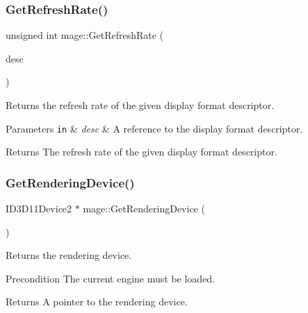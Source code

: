 \subsubsection{\texorpdfstring{Get\+Refresh\+Rate()}{GetRefreshRate()}}
{\footnotesize\ttfamily unsigned int mage\+::\+Get\+Refresh\+Rate (\begin{DoxyParamCaption}\item[{const D\+X\+G\+I\+\_\+\+M\+O\+D\+E\+\_\+\+D\+E\+S\+C1 \&}]{desc }\end{DoxyParamCaption})\hspace{0.3cm}{\ttfamily [noexcept]}}

Returns the refresh rate of the given display format descriptor.


\begin{DoxyParams}[1]{Parameters}
\mbox{\tt in}  & {\em desc} & A reference to the display format descriptor. \\
\hline
\end{DoxyParams}
\begin{DoxyReturn}{Returns}
The refresh rate of the given display format descriptor. 
\end{DoxyReturn}
\hypertarget{namespacemage_aa20b591269a1196de06bb1b8a6be5262}{}\label{namespacemage_aa20b591269a1196de06bb1b8a6be5262} 
\subsubsection{\texorpdfstring{Get\+Rendering\+Device()}{GetRenderingDevice()}}
{\footnotesize\ttfamily I\+D3\+D11\+Device2 $\ast$ mage\+::\+Get\+Rendering\+Device (\begin{DoxyParamCaption}{ }\end{DoxyParamCaption})\hspace{0.3cm}{\ttfamily [noexcept]}}

Returns the rendering device.

\begin{DoxyPrecond}{Precondition}
The current engine must be loaded. 
\end{DoxyPrecond}
\begin{DoxyReturn}{Returns}
A pointer to the rendering device. 
\end{DoxyReturn}
\hypertarget{namespacemage_a5c2720129d998cd7202aacaa59d5054d}{}\label{namespacemage_a5c2720129d998cd7202aacaa59d5054d} 
